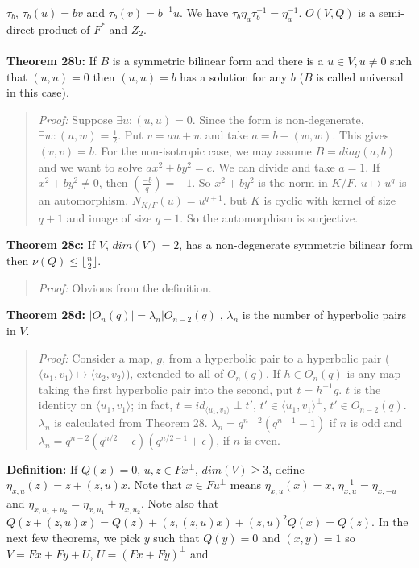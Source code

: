 $\tau_b$,  $\tau_b(u)= b v$ and $\tau_b(v)= b^{-1}u$.
We have $\tau_b \eta_a \tau_b^{-1}= \eta_a^{-1}$.  $O(V,Q)$ is a semi-direct product
of $F^*$ and $Z_2$.
\\
\\
{\bf Theorem 28b:} If $B$ is a symmetric bilinear form and there is a $u \in V, u \neq 0$ such that
$(u,u)=0$ then $(u,u) = b$ has a solution for any $b$ ($B$ is called universal in this case).
\begin{quote}
\emph{Proof:}  
Suppose $\exists u: (u,u) = 0$.  Since the form is non-degenerate,
$\exists w: (u,w) = {\frac 1 2}$.  Put $v=au+w$ and take $a = b -(w,w)$.  This gives
$(v,v) = b$.  For the non-isotropic case, we may assume $B= diag(a,b)$ and
we want to solve $ax^2 + by^2 = c$.  We can divide and take $a=1$.
If $x^2 + b y^2 \neq 0$, then $({\frac {-b} {q}}) = -1$. So $x^2+by^2$ is
the norm in $K/F$. $u \mapsto u^q$ is an automorphism.  $N_{K/F}(u)= u^{q+1}$.
but $K$ is cyclic with kernel of size $q+1$ and image of size $q-1$.  So the automorphism
is surjective.
\end{quote}
{\bf Theorem 28c:}
If $V$, $dim(V)=2$, has a non-degenerate symmetric bilinear form 
then $\nu(Q) \le \lfloor {\frac n 2} \rfloor$.
\begin{quote}
\emph{Proof:}  
Obvious from the definition.
\end{quote}
{\bf Theorem 28d:}
$|O_n(q)| = \lambda_n |O_{n-2}(q)|$, $\lambda_n$ is the number of hyperbolic pairs in $V$.
\begin{quote}
\emph{Proof:}  
Consider a map, $g$, from a hyperbolic pair to a hyperbolic pair ($\langle u_1, v_1 \rangle \mapsto \langle u_2, v_2 \rangle$),
extended to all of $O_n(q)$.  If $h \in O_n(q)$ is any map taking the first hyperbolic pair into the second, put
$t= h^{-1}g$.  $t$ is the identity on $\langle u_1, v_1 \rangle$; in fact, $t = id_{\langle u_1, v_1 \rangle} \perp t'$,
$t' \in \langle u_1, v_1 \rangle ^ {\perp}$, $t' \in O_{n-2}(q)$. $\lambda_n$ is calculated from
Theorem 28.
$\lambda_n = q^{n-2} (q^{n-1} - 1)$ if $n$ is odd and
$\lambda_n = q^{n-2} (q^{n/2} - \epsilon) (q^{n/2-1} + \epsilon) $, if $n$ is even.
\end{quote}
{\bf Definition:} If $Q(x) = 0$, $u, z \in Fx^\perp$, $dim(V) \geq 3$, define $\eta_{x,u}(z) = z + (z,u) x$.
Note that $x \in F u^\perp$ means $\eta_{x,u}(x) = x$, $\eta_{x,u}^{-1} = \eta_{x,-u}$ and
$\eta_{x, u_1 + u_2} = \eta_{x,u_1} + \eta_{x,u_2}$.  Note also that 
$Q(z + (z,u)x)= Q(z) + (z,(z,u)x) + (z,u)^2 Q(x) = Q(z)$.  In the next few theorems,
we pick $y$ such that $Q(y)=0$ and $(x, y) = 1$ so $V = Fx + Fy + U$, $U = (Fx + Fy)^\perp$ and
